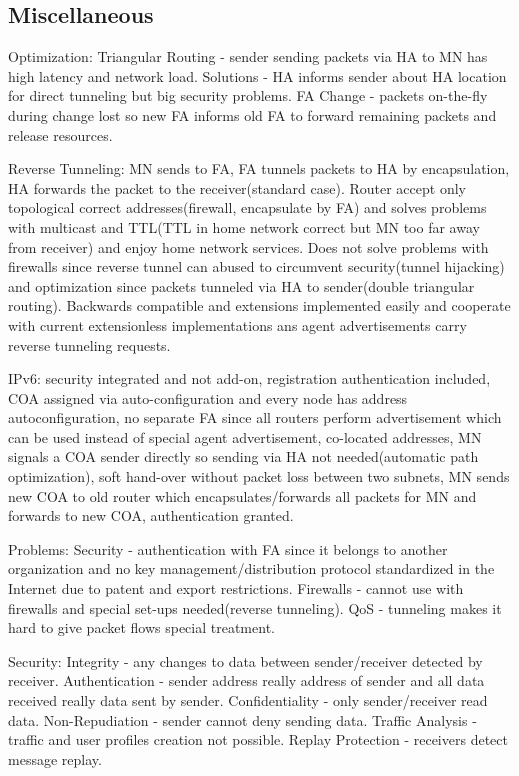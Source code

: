 \documentclass[8pt]{extarticle}
\begin{document}
\begin{multicols}{2}
\subsection{Miscellaneous}

Optimization: Triangular Routing - sender sending packets via HA to MN has high latency and network load. Solutions - HA informs sender about HA location for direct tunneling but big security problems. FA Change - packets on-the-fly during change lost so new FA informs old FA to forward remaining packets and release resources.

Reverse Tunneling: MN sends to FA, FA tunnels packets to HA by encapsulation, HA forwards the packet to the receiver(standard case). Router accept only topological correct addresses(firewall, encapsulate by FA) and solves problems with multicast and TTL(TTL in home network correct but MN too far away from receiver) and enjoy home network services. Does not solve problems with firewalls since reverse tunnel can abused to circumvent security(tunnel hijacking) and optimization since packets tunneled via HA to sender(double triangular routing). Backwards compatible and extensions implemented easily and cooperate with current extensionless implementations ans agent advertisements carry reverse tunneling requests.

IPv6: security integrated and not add-on, registration authentication included, COA assigned via auto-configuration and every node has address autoconfiguration, no separate FA since all routers perform advertisement which can be used instead of special agent advertisement, co-located addresses, MN signals a COA sender directly so sending via HA not needed(automatic path optimization), soft hand-over without packet loss between two subnets, MN sends new COA to old router which encapsulates/forwards all packets for MN and forwards to new COA, authentication granted.

Problems: Security - authentication with FA since it belongs to another organization and no key management/distribution protocol  standardized in the Internet due to patent and export restrictions. Firewalls - cannot use with firewalls and special set-ups needed(reverse tunneling). QoS - tunneling makes it hard to give packet flows special treatment.

Security: Integrity - any changes to data between sender/receiver detected by receiver. Authentication - sender address really address of sender and all data received really data sent by sender. Confidentiality - only sender/receiver read data. Non-Repudiation - sender cannot deny sending data. Traffic Analysis - traffic and user profiles creation not possible. Replay Protection - receivers detect message replay.


\end{multicols}
\end{document}
